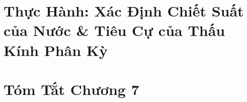 \documentclass[oneside]{book}
\numberwithin{equation}{section}
\begin{document}

\section{Thực Hành: Xác Định Chiết Suất của Nước \& Tiêu Cự của Thấu Kính Phân Kỳ}


\section{Tóm Tắt Chương 7}


\printbibliography[heading=bibintoc]
	
\end{document}
